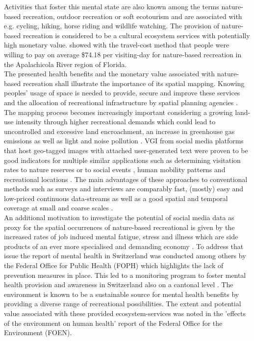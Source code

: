Activities that foster this mental state are also known among the terms nature-based recreation, outdoor recreation or soft ecotourism \parencite{Deng2002, Balmford2009} and are associated with e.g. cycling, hiking, horse riding and wildlife watching. The provision of nature-based recreation is considered to be a cultural ecosystem services \parencite{Weyland2014, Richards2018, Yoshimura2017} with potentially high monetary value. \textcite{Shrestha2007} showed with the travel-cost method that people were willing to pay on average \$74.18 per visiting-day for nature-based recreation in the Apalachicola River region of Florida. \\
The presented health benefits and the monetary value associated with nature-based recreation shall illustrate the importance of its spatial mapping. Knowing peoples' usage of space is needed to provide, secure and improve these services and the allocation of recreational infrastructure by spatial planning agencies \parencite{Sen2014}. The mapping process becomes increasingly important considering a growing land-use intensity through higher recreational demands which could lead to uncontrolled and excessive land encroachment, an increase in greenhouse gas emissions as well as light and noise pollution \parencite{Song2018}.
VGI from social media platforms that host geo-tagged images with attached user-generated text were proven to be good indicators for multiple similar applications such as determining visitation rates to nature reserves \parencite{Tenkanen2017, Heikinheimo2017, Keeler2015, Wood2013, Fisher2018} or to social events \parencite{Pettersson2011}, human mobility patterns \parencite{Barchiesi2015, Grossenbacher2014} and recreational locations \parencite{Weyland2014, Hill2006, Neuvonen2010}. The main advantages of these approaches to conventional methods such as surveys and interviews are comparably fast, (mostly) easy and low-priced \parencite{Richards2018} continuous data-streams as well as a good spatial and temporal coverage at small \parencite{Buckee2015b} and coarse scales \parencite{Weyland2014}. \\
An additional motivation to investigate the potential of social media data as proxy for the spatial occurrences of nature-based recreational is given by the increased rates of job induced mental fatigue, stress and illness which are side products of an ever more specialised and demanding economy \parencite{Trenberth2002}. To address that issue the report of mental health in Switzerland \parencite{Ruesch2003} was conducted among others by the Federal Office for Public Health (FOPH) which highlights the lack of prevention measures in place. This led to a monitoring program to foster mental health provision and awareness in Switzerland also on a cantonal level \parencite{Schuler2012}. The environment is known to be a sustainable source for mental health benefits by providing a diverse range of recreational possibilities. The extent and potential value associated with these provided ecosystem-services was noted in the 'effects of the environment on human health' report \parencite{Ragettli2017} of the Federal Office for the Environment (FOEN).

